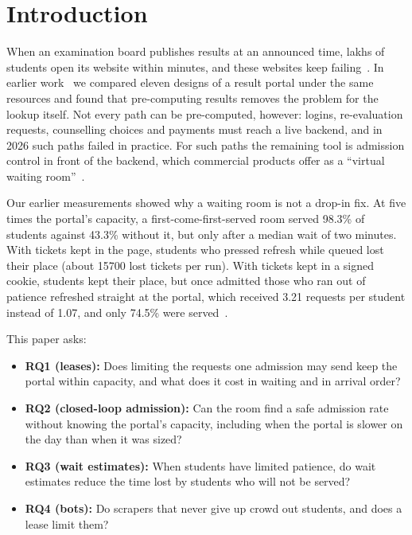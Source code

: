 \section{Introduction}

When an examination board publishes results at an announced time, lakhs of
students open its website within minutes, and these websites keep
failing~\cite{ht2021ssc,pagalguy2016jee,knec2025x}. In earlier
work~\cite{pathak2026surviving} we compared eleven designs of a result portal
under the same resources and found that pre-computing results removes the
problem for the lookup itself. Not every path can be pre-computed, however:
logins, re-evaluation requests, counselling choices and payments must reach
a live backend, and in 2026 such paths failed in practice.
For such paths the remaining tool is admission control in front of the
backend, which commercial products offer as a ``virtual waiting
room''~\cite{cloudflare2026wr,aws2022vwr}.

Our earlier measurements showed why a waiting room is not a drop-in fix. At
five times the portal's capacity, a first-come-first-served room served
98.3\% of students against 43.3\% without it, but only after a median wait of
two minutes. With tickets kept in the page, students who pressed refresh while
queued lost their place (about \num{15700} lost tickets per run). With
tickets kept in a signed cookie,
students kept their place, but once admitted those who ran out of patience
refreshed straight at the portal, which received 3.21 requests per student
instead of 1.07, and only 74.5\% were served~\cite{pathak2026surviving}.

This paper asks:
\begin{itemize}
\item \textbf{RQ1 (leases):} Does limiting the requests one admission may
send keep the portal within capacity, and what does it cost in waiting and in
arrival order?
\item \textbf{RQ2 (closed-loop admission):} Can the room find a safe
admission rate without knowing the portal's capacity, including when the
portal is slower on the day than when it was sized?
\item \textbf{RQ3 (wait estimates):} When students have limited patience,
do wait estimates reduce the time lost by students who will not be served?
\item \textbf{RQ4 (bots):} Do scrapers that never give up crowd out students,
and does a lease limit them?
\end{itemize}

